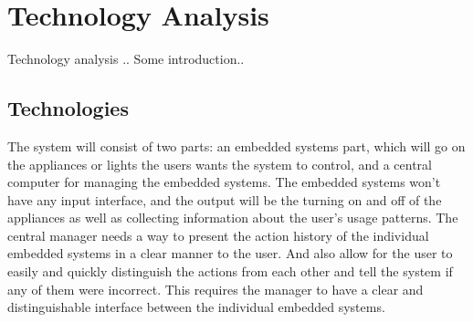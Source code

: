 \section{Technology Analysis}
\label{chap:Technology Analysis}
Technology analysis    .. Some introduction..
\subsection{Technologies}
\label{sub:Technologies}
The system will consist of two parts: an embedded systems part, which will go on
the appliances or lights the users wants the system to control, and a central
computer for managing the embedded systems. The embedded systems won't have any
input interface, and the output will be the turning on and off of the appliances
as well as collecting information about the user's usage patterns.
The central manager needs a way to present the action history of the individual embedded systems in a clear manner to the user.
And also allow for the user to easily and quickly distinguish the actions from each other and tell the system if any of them were incorrect.
This requires the manager to have a clear and distinguishable interface between the individual embedded systems.
